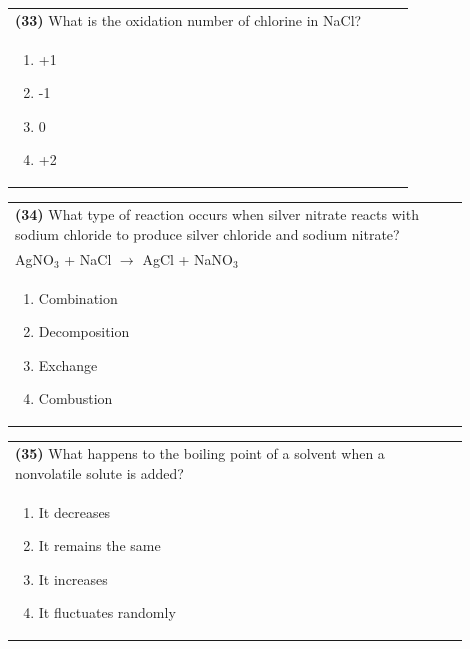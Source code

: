 \documentclass{article}
\begin{document}
\noindent\begin{tabular}{|p{0.9\linewidth}|}
\hline
\textbf{(33)} What is the oxidation number of chlorine in NaCl?\\[0.2cm]
\begin{minipage}[t]{0.85\linewidth}
\begin{enumerate}[label=\alph*.]
\item +1
\item -1
\item 0
\item +2
\end{enumerate}
\end{minipage}\\[0.2cm]
\hline
\end{tabular}

\noindent\begin{tabular}{|p{0.9\linewidth}|}
\hline
\textbf{(34)} What type of reaction occurs when silver nitrate reacts with sodium chloride to produce silver chloride and sodium nitrate?\\[0.2cm]
AgNO$_3$ + NaCl $\rightarrow$ AgCl + NaNO$_3$\\[0.2cm]
\begin{minipage}[t]{0.85\linewidth}
\begin{enumerate}[label=\alph*.]
\item Combination
\item Decomposition
\item Exchange
\item Combustion
\end{enumerate}
\end{minipage}\\[0.2cm]
\hline
\end{tabular}

\noindent\begin{tabular}{|p{0.9\linewidth}|}
\hline
\textbf{(35)} What happens to the boiling point of a solvent when a nonvolatile solute is added?\\[0.2cm]
\begin{minipage}[t]{0.85\linewidth}
\begin{enumerate}[label=\alph*.]
\item It decreases
\item It remains the same
\item It increases
\item It fluctuates randomly
\end{enumerate}
\end{minipage}\\[0.2cm]
\hline
\end{tabular}
\end{document}
